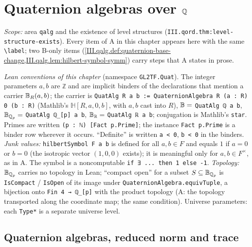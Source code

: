 \chapter{Quaternion algebras over $\mathbb{Q}$}\label{ch:ch-iii-06-quatalg}

\noindent\emph{Scope:} area \texttt{qalg} and the existence of level structures (\texttt{III.qord.thm:level-structure-exists}).
Every item of A in this chapter appears here with the same \texttt{\textbackslash label}; two B-only items
(\cref{III.qalg.def:quaternion-base-change,III.qalg.lem:hilbert-symbol-symm}) carry steps that A states in prose.

\noindent\emph{Lean conventions of this chapter} (namespace \texttt{GL2TF.Quat}). The integer parameters $a,b$ are \texttt{ℤ} and are implicit binders of the
declarations that mention a carrier $\mathbb{B}_R(a,b)$; the carrier is \texttt{QuatAlg R a b := QuaternionAlgebra R (a : R) 0 (b : R)} (Mathlib's $\mathbb H[R,a,0,b]$, with
$a,b$ cast into $R$), $\mathbb{B}=$ \texttt{QuatAlg ℚ a b}, $\mathbb{B}_{\mathbb{Q}_p}=$ \texttt{QuatAlg ℚ\_[p] a b}, $\mathbb{B}_{\mathbb{R}}=$ \texttt{QuatAlg ℝ a b}; conjugation is Mathlib's \texttt{star}.
Primes are written \texttt{(p : ℕ) [Fact p.Prime]}; the instance \texttt{Fact p.Prime} is a binder row wherever it occurs. ``Definite'' is written \texttt{a < 0}, \texttt{b < 0} in
the binders. \emph{Junk values:} \texttt{hilbertSymbol F a b} is defined for all $a,b\in F$ and equals $1$ if $a=0$ or $b=0$ (the isotropic vector $(1,0,0)$ exists); it is meaningful
only for $a,b\in F^\times$, as in A. The symbol is a noncomputable \texttt{if ∃ ... then 1 else -1}. \emph{Topology:} $\mathbb{B}_{\mathbb{Q}_p}$ carries no topology in Lean; ``compact open'' for a subset
$S\subseteq\mathbb{B}_{\mathbb{Q}_p}$ is \texttt{IsCompact} / \texttt{IsOpen} of its image under \texttt{QuaternionAlgebra.equivTuple}, a bijection onto \texttt{Fin 4 → ℚ\_[p]} with the product topology
(A: the topology transported along the coordinate map; the same condition). Universe parameters: each \texttt{Type*} is a separate universe level.
\section{Quaternion algebras, reduced norm and trace}\label{sec:qalg-basic}

